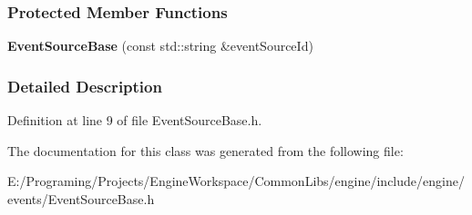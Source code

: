 \subsubsection*{Protected Member Functions}
\begin{DoxyCompactItemize}
\item 
{\bfseries Event\+Source\+Base} (const std\+::string \&event\+Source\+Id)\hypertarget{a00036_aaf869f7f30d31a3eb2713937e8a8f902}{}\label{a00036_aaf869f7f30d31a3eb2713937e8a8f902}

\end{DoxyCompactItemize}


\subsubsection{Detailed Description}


Definition at line 9 of file Event\+Source\+Base.\+h.



The documentation for this class was generated from the following file\+:\begin{DoxyCompactItemize}
\item 
E\+:/\+Programing/\+Projects/\+Engine\+Workspace/\+Common\+Libs/engine/include/engine/events/Event\+Source\+Base.\+h\end{DoxyCompactItemize}

